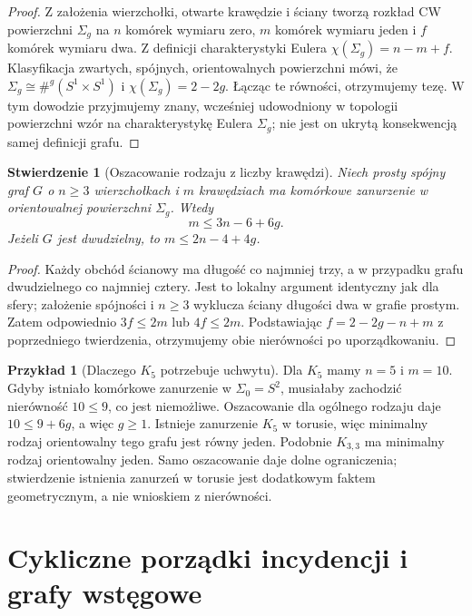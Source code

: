 \documentclass[11pt,a4paper]{report}
\numberwithin{equation}{section}
\theoremstyle{plain}
\newtheorem{stwierdzenie}[twierdzenie]{Stwierdzenie}
\theoremstyle{definition}
\newtheorem{przyklad}[twierdzenie]{Przykład}
\theoremstyle{remark}
\begin{document}
\begin{proof}
Z założenia wierzchołki, otwarte krawędzie i ściany
tworzą rozkład CW powierzchni $\Sigma_g$ na $n$
komórek wymiaru zero, $m$ komórek wymiaru jeden i $f$
komórek wymiaru dwa. Z definicji charakterystyki Eulera
$\chi(\Sigma_g)=n-m+f$. Klasyfikacja zwartych, spójnych,
orientowalnych powierzchni mówi, że
$\Sigma_g\cong\#^g(S^1\times S^1)$ i
$\chi(\Sigma_g)=2-2g$. Łącząc te równości,
otrzymujemy tezę. W tym dowodzie przyjmujemy znany,
wcześniej udowodniony w topologii powierzchni wzór
na charakterystykę Eulera \(\Sigma_g\); nie jest on
ukrytą konsekwencją samej definicji grafu.
\end{proof}

\begin{stwierdzenie}[Oszacowanie rodzaju z liczby krawędzi]
Niech prosty spójny graf $G$ o $n\ge3$ wierzchołkach
i $m$ krawędziach ma komórkowe zanurzenie w orientowalnej
powierzchni $\Sigma_g$. Wtedy
\[
 m\le3n-6+6g.
\]
Jeżeli $G$ jest dwudzielny, to
$m\le2n-4+4g$.
\end{stwierdzenie}

\begin{proof}
Każdy obchód ścianowy ma długość co najmniej trzy,
a w przypadku grafu dwudzielnego co najmniej cztery.
Jest to lokalny argument identyczny jak dla sfery;
założenie spójności i $n\ge3$ wyklucza ściany długości
dwa w grafie prostym. Zatem odpowiednio $3f\le2m$
lub $4f\le2m$. Podstawiając
$f=2-2g-n+m$ z poprzedniego twierdzenia,
otrzymujemy obie nierówności po uporządkowaniu.
\end{proof}

\begin{przyklad}[Dlaczego $K_5$ potrzebuje uchwytu]
Dla $K_5$ mamy $n=5$ i $m=10$. Gdyby istniało
komórkowe zanurzenie w $\Sigma_0=S^2$, musiałaby zachodzić
nierówność $10\le9$, co jest niemożliwe.
Oszacowanie dla ogólnego rodzaju daje
$10\le9+6g$, a więc $g\ge1$.
Istnieje zanurzenie $K_5$ w torusie, więc minimalny
rodzaj orientowalny tego grafu jest równy jeden.
Podobnie $K_{3,3}$ ma minimalny rodzaj orientowalny jeden.
Samo oszacowanie daje dolne ograniczenia; stwierdzenie
istnienia zanurzeń w torusie jest dodatkowym faktem
geometrycznym, a nie wnioskiem z nierówności.
\end{przyklad}

\section{Cykliczne porządki incydencji i grafy wstęgowe}
\label{sec:tg-rotation}
\end{document}
